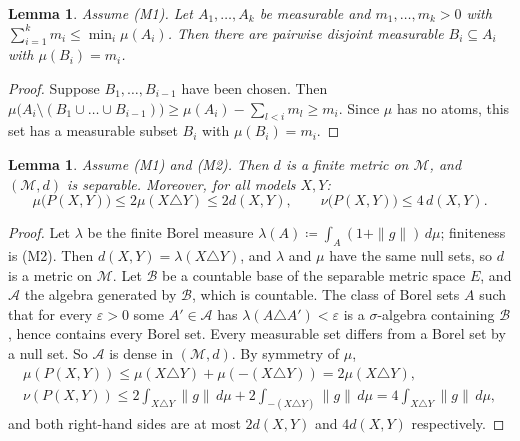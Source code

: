 \documentclass[11pt]{article}
\newtheorem{lemma}[theorem]{Lemma}
\theoremstyle{definition}
\newcommand{\M}{\mathcal M}
\begin{document}
\begin{lemma}\label{lem:extraction}
Assume (M1). Let $A_1,\dots,A_k$ be measurable and $m_1,\dots,m_k>0$ with $\sum_{i=1}^km_i\le\min_i\mu(A_i)$. Then there are pairwise disjoint measurable $B_i\subseteq A_i$ with $\mu(B_i)=m_i$.
\end{lemma}
\begin{proof}
Suppose $B_1,\dots,B_{i-1}$ have been chosen. Then $\mu\bigl(A_i\setminus(B_1\cup\dots\cup B_{i-1})\bigr)\ge\mu(A_i)-\sum_{l<i}m_l\ge m_i$. Since $\mu$ has no atoms, this set has a measurable subset $B_i$ with $\mu(B_i)=m_i$.
\end{proof}

\begin{lemma}\label{lem:separable}
Assume (M1) and (M2). Then $d$ is a finite metric on $\M$, and $(\M,d)$ is separable. Moreover, for all models $X,Y$:
\[
\mu\bigl(P(X,Y)\bigr)\le2\mu(X\triangle Y)\le2d(X,Y),\qquad \nu\bigl(P(X,Y)\bigr)\le4\,d(X,Y).
\]
\end{lemma}
\begin{proof}
Let $\lambda$ be the finite Borel measure $\lambda(A)\coloneqq\int_A(1+\|g\|)\,d\mu$; finiteness is (M2). Then $d(X,Y)=\lambda(X\triangle Y)$, and $\lambda$ and $\mu$ have the same null sets, so $d$ is a metric on $\M$. Let $\mathcal B$ be a countable base of the separable metric space $E$, and $\mathcal A$ the algebra generated by $\mathcal B$, which is countable. The class of Borel sets $A$ such that for every $\varepsilon>0$ some $A'\in\mathcal A$ has $\lambda(A\triangle A')<\varepsilon$ is a $\sigma$-algebra containing $\mathcal B$, hence contains every Borel set. Every measurable set differs from a Borel set by a null set. So $\mathcal A$ is dense in $(\M,d)$. By symmetry of $\mu$,
\begin{gather*}
\mu(P(X,Y))\le\mu(X\triangle Y)+\mu(-(X\triangle Y))=2\mu(X\triangle Y),\\
\nu(P(X,Y))\le2\int_{X\triangle Y}\|g\|\,d\mu+2\int_{-(X\triangle Y)}\|g\|\,d\mu=4\int_{X\triangle Y}\|g\|\,d\mu,
\end{gather*}
and both right-hand sides are at most $2d(X,Y)$ and $4d(X,Y)$ respectively.
\end{proof}
\end{document}
